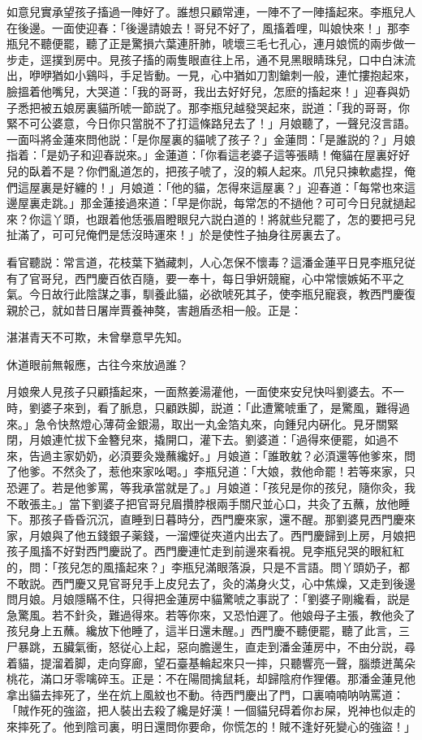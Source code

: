 如意兒實承望孩子搐過一陣好了。誰想只顧常連，一陣不了一陣搐起來。李瓶兒人在後邊。一面使迎春：「後邊請娘去！哥兒不好了，風搐着哩，叫娘快來！」那李瓶兒不聽便罷，聽了正是驚損六葉連肝肺，唬壞三毛七孔心，連月娘慌的兩步做一步走，逕撲到房中。見孩子搐的兩隻眼直往上吊，通不見黑眼睛珠兒，口中白沫流出，咿咿猶如小鷄呌，手足皆動。一見，心中猶如刀割鎗刺一般，連忙摟抱起來，臉搵着他嘴兒，大哭道：「我的哥哥，我出去好好兒，怎麽的搐起來！」迎春與奶子悉把被五娘房裏貓所唬一節説了。那李瓶兒越發哭起來，説道：「我的哥哥，你緊不可公婆意，今日你只當脱不了打這條路兒去了！」月娘聽了，一聲兒沒言語。一面呌將金蓮來問他説：「是你屋裏的貓唬了孩子？」金蓮問：「是誰説的？」月娘指着：「是奶子和迎春説來。」金蓮道：「你看這老婆子這等張睛！俺貓在屋裏好好兒的臥着不是？你們亂道怎的，把孩子唬了，沒的賴人起來。爪兒只揀軟處捏，俺們這屋裏是好纏的！」月娘道：「他的貓，怎得來這屋裏？」迎春道：「每常也來這邊屋裏走跳。」那金蓮接過來道：「早是你説，每常怎的不撾他？可可今日兒就撾起來？你這丫頭，也跟着他恁張眉瞪眼兒六説白道的！將就些兒罷了，怎的要把弓兒扯滿了，可可兒俺們是恁沒時運來！」於是使性子抽身往房裏去了。

看官聽説：常言道，花枝葉下猶藏刺，人心怎保不懷毒？這潘金蓮平日見李瓶兒従有了官哥兒，西門慶百依百隨，要一奉十，每日爭姸競寵，心中常懷嫉妬不平之氣。今日故行此陰謀之事，馴養此貓，必欲唬死其子，使李瓶兒寵衰，教西門慶復親於己，就如昔日屠岸賈養神獒，害趙盾丞相一般。正是：

湛湛青天不可欺，未曾擧意早先知。

休道眼前無報應，古往今來放過誰？

月娘衆人見孩子只顧搐起來，一面熬姜湯灌他，一面使來安兒快呌劉婆去。不一時，劉婆子來到，看了脈息，只顧跌脚，説道：「此遭驚唬重了，是驚風，難得過來。」急令快熬燈心薄荷金銀湯，取出一丸金箔丸來，向鍾兒内硏化。見牙關緊閉，月娘連忙拔下金簪兒來，撬開口，灌下去。劉婆道：「過得來便罷，如過不來，告過主家奶奶，必湏要灸幾蘸纔好。」月娘道：「誰敢躭？必湏還等他爹來，問了他爹。不然灸了，惹他來家吆喝。」李瓶兒道：「大娘，救他命罷！若等來家，只恐遲了。若是他爹罵，等我承當就是了。」月娘道：「孩兒是你的孩兒，隨你灸，我不敢張主。」當下劉婆子把官哥兒眉攢脖根兩手關尺並心口，共灸了五蘸，放他睡下。那孩子昏昏沉沉，直睡到日暮時分，西門慶來家，還不醒。那劉婆見西門慶來家，月娘與了他五錢銀子薬錢，一溜煙従夾道内出去了。西門慶歸到上房，月娘把孩子風搐不好對西門慶説了。西門慶連忙走到前邊來看視。見李瓶兒哭的眼紅紅的，問：「孩兒怎的風搐起來？」李瓶兒滿眼落淚，只是不言語。問丫頭奶子，都不敢説。西門慶又見官哥兒手上皮兒去了，灸的滿身火艾，心中焦燥，又走到後邊問月娘。月娘隱瞞不住，只得把金蓮房中貓驚唬之事説了：「劉婆子剛纔看，説是急驚風。若不針灸，難過得來。若等你來，又恐怕遲了。他娘母子主張，教他灸了孩兒身上五蘸。纔放下他睡了，這半日還未醒。」西門慶不聽便罷，聽了此言，三尸暴跳，五臟氣衝，怒従心上起，惡向膽邊生，直走到潘金蓮房中，不由分説，尋着貓，提溜着脚，走向穿廊，望石臺基輪起來只一摔，只聽響亮一聲，腦漿迸萬朵桃花，滿口牙零噙碎玉。正是：不在陽間擒鼠耗，却歸陰府作狸僊。那潘金蓮見他拿出貓去摔死了，坐在炕上風紋也不動。待西門慶出了門，口裏喃喃呐呐罵道：「賊作死的強盜，把人裝出去殺了纔是好漢！一個貓兒碍着你お屎，兇神也似走的來摔死了。他到陰司裏，明日還問你要命，你慌怎的！賊不逢好死變心的強盜！」

